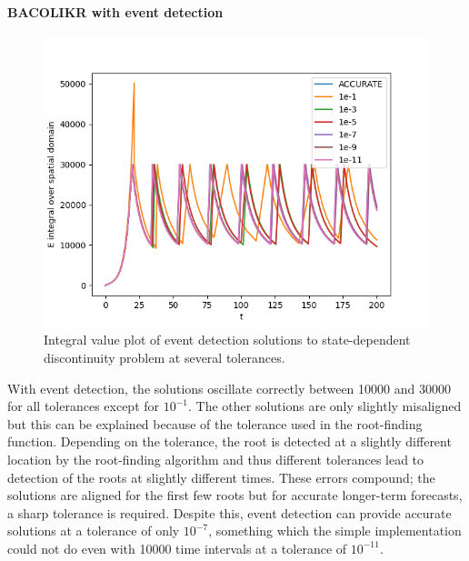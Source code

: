 \paragraph{BACOLIKR with event detection}
\begin{figure}[H]
\centering
\includegraphics[width=0.7\linewidth]{./figures/pde_state_disc_tol_event}
\caption{Integral value plot of event detection solutions to state-dependent discontinuity problem at several tolerances.}
\label{fig:pde_state_disc_tol_event}
\end{figure}

With event detection, the solutions oscillate correctly between 10000 and 30000 for all tolerances except for $10^{-1}$. The other solutions are only slightly misaligned but this can be explained because of the tolerance used in the root-finding function. Depending on the tolerance, the root is detected at a slightly different location by the root-finding algorithm and thus different tolerances lead to detection of the roots at slightly different times. These errors compound; the solutions are aligned for the first few roots but for accurate longer-term forecasts, a sharp tolerance is required. Despite this, event detection can provide accurate solutions at a tolerance of only $10^{-7}$, something which the simple implementation could not do even with 10000 time intervals at a tolerance of $10^{-11}$.

